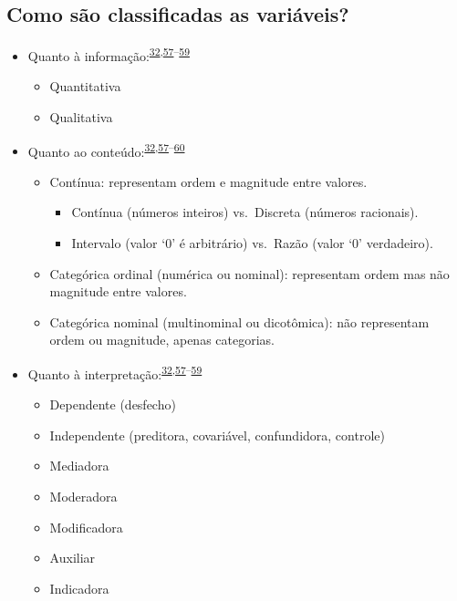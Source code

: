 \documentclass[
  a4paper,
]{book}
\begin{document}
\hypertarget{como-suxe3o-classificadas-as-variuxe1veis}{%
\subsection{Como são classificadas as variáveis?}\label{como-suxe3o-classificadas-as-variuxe1veis}}

\begin{itemize}
\item
  Quanto à informação:\textsuperscript{\protect\hyperlink{ref-vetter2017}{32},\protect\hyperlink{ref-Ali2016}{57}--\protect\hyperlink{ref-kaliyadan2019}{59}}

  \begin{itemize}
  \item
    Quantitativa
  \item
    Qualitativa
  \end{itemize}
\item
  Quanto ao conteúdo:\textsuperscript{\protect\hyperlink{ref-vetter2017}{32},\protect\hyperlink{ref-Ali2016}{57}--\protect\hyperlink{ref-barkan2015}{60}}

  \begin{itemize}
  \item
    Contínua: representam ordem e magnitude entre valores.

    \begin{itemize}
    \item
      Contínua (números inteiros) vs.~Discreta (números racionais).
    \item
      Intervalo (valor `0' é arbitrário) vs.~Razão (valor `0' verdadeiro).
    \end{itemize}
  \item
    Categórica ordinal (numérica ou nominal): representam ordem mas não magnitude entre valores.
  \item
    Categórica nominal (multinominal ou dicotômica): não representam ordem ou magnitude, apenas categorias.
  \end{itemize}
\item
  Quanto à interpretação:\textsuperscript{\protect\hyperlink{ref-vetter2017}{32},\protect\hyperlink{ref-Ali2016}{57}--\protect\hyperlink{ref-kaliyadan2019}{59}}

  \begin{itemize}
  \item
    Dependente (desfecho)
  \item
    Independente (preditora, covariável, confundidora, controle)
  \item
    Mediadora
  \item
    Moderadora
  \item
    Modificadora
  \item
    Auxiliar
  \item
    Indicadora
  \end{itemize}
\end{itemize}
\end{document}
